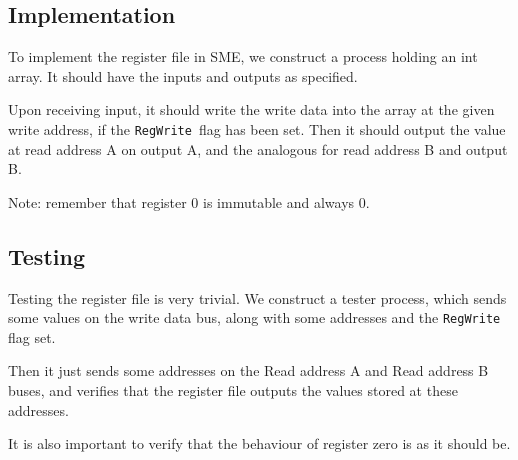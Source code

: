 \documentclass{beamer}
\begin{document}
\subsection{Implementation}
\begin{frame}
    To implement the register file in SME, we construct a process holding an
    int array. It should have the inputs and outputs as specified.

    \vspace{\baselineskip}
    Upon receiving input, it should write the write data into the array at the
    given write address, if the \texttt{RegWrite} flag has been set. Then it
    should output the value at read address A on output A, and the analogous
    for read address B and output B.

    \vspace{\baselineskip}
    Note: remember that register 0 is immutable and always 0.
\end{frame}
\subsection{Testing}
\begin{frame}
    Testing the register file is very trivial. We construct a tester process,
    which sends some values on the write data bus, along with some addresses
    and the \texttt{RegWrite} flag set.

    \vspace{\baselineskip}
    Then it just sends some addresses on the Read address A and Read address B
    buses, and verifies that the register file outputs the values stored at
    these addresses.

    \vspace{\baselineskip}
    It is also important to verify that the behaviour of register zero is as it
    should be.
\end{frame}
\end{document}

